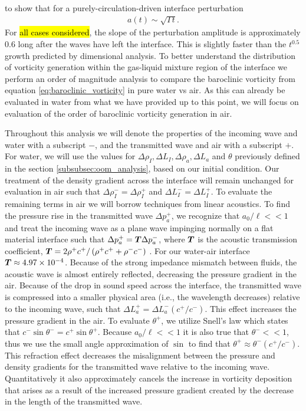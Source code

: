 to show that for a purely-circulation-driven interface perturbation
% 
\begin{align} \label{eq:intf_circ_scaling}
  a(t) \sim \sqrt{\Gamma t}.
\end{align}
% 
For \hl{all cases considered}, the slope of the perturbation amplitude
is approximately $0.6$ long after the waves have left the
interface. This is slightly faster than the $t^{0.5}$ growth predicted by
dimensional analysis. 
% 
% 
To better understand the distribution of vorticity generation within
the gas-liquid mixture region of the interface we perform an order of
magnitude analysis to compare the baroclinic vorticity from equation
\eqref{eq:baroclinic_vorticity} in pure water vs air. As this can
already be evaluated in water from what we have provided up to this
point, we will focus on evaluation of the order of baroclinic
vorticity generation in air.

Throughout this analysis we will denote the properties of the incoming
wave and water with a subscript $-$, and the transmitted wave and air
with a subscript $+$. For water, we will use the values for
$\Delta \rho_I, \Delta L_I, \Delta \rho_a, \Delta L_a$ and $\theta$
previously defined in the section \ref{subsubsec:oom_analysis}, based
on our initial condition. Our treatment of the density gradient across
the interface will remain unchanged for evaluation in air such that
$\Delta \rho_I^-=\Delta \rho_I^+$ and $\Delta L_I^-=\Delta L_I^+$. To
evaluate the remaining terms in air we will borrow techniques from
linear acoustics. To find the pressure rise in the transmitted wave
$\Delta p_a^+$, we recognize that $a_0/\ell<<1$ and treat the
incoming wave as a plane wave impinging normally on a flat material
interface such that $\Delta p_a^+=\boldsymbol{T} \Delta p_a^-$, where $\boldsymbol{T}$
is the acoustic transmission coefficient,
$\boldsymbol{T}=2\rho^+ c^+/\left(\rho^+ c^+ + \rho^- c^- \right)$
\citep{Kinsler1982}. For our water-air interface
$\boldsymbol{T}\approx4.97\times10^{-4}$. Because of the strong impedance
mismatch between fluids, the acoustic wave is almost entirely
reflected, decreasing the pressure gradient in the air. Because of the
drop in sound speed across the interface, the transmitted wave is
compressed into a smaller physical area (i.e., the wavelength
decreases) relative to the incoming wave, such that
$\Delta L_a^+=\Delta L_a^- (c^+/c^-)$. This effect increases the
pressure gradient in the air. To evaluate $\theta^+$, we utilize
Snell's law which states that
$c^-\sin{\theta^-}=c^+\sin{\theta^+}$. Because $a_0/\ell<<1$ it is
also true that $\theta^-<<1$, thus we use the small angle
approximation of $\sin$ to find that
$\theta^+\approx\theta^-(c^+/c^-)$. This refraction effect decreases
the misalignment between the pressure and density gradients for the
transmitted wave relative to the incoming wave. Quantitatively it also
approximately cancels the increase in vorticity deposition that arises
as a result of the increased pressure gradient created by the decrease
in the length of the transmitted wave.

